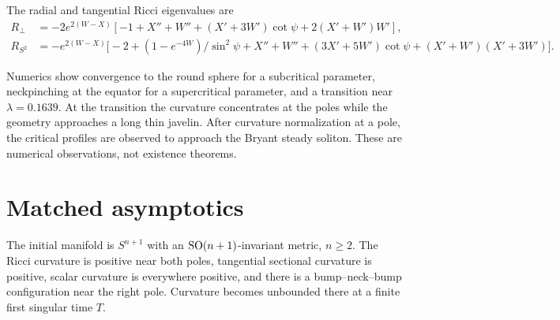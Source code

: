 \begin{definition}
\label{def:chow-iv-rotational-ricci-eigenvalues}
The radial and tangential Ricci eigenvalues are
\begin{align*}
 R_\perp&=-2e^{2(W-X)}[-1+X''+W''+(X'+3W')\cot\psi+2(X'+W')W'],\\
 R_{S^2}&=-e^{2(W-X)}\bigl[-2+(1-e^{-4W})/\sin^2\psi+X''+W''
 +(3X'+5W')\cot\psi +(X'+W')(X'+3W')\bigr].
\end{align*}
\end{definition}

\begin{remark}
\label{rem:chow-iv-numerical-phase-transition}
Numerics show convergence to the round sphere for a subcritical parameter,
neckpinching at the equator for a supercritical parameter, and a transition
near $\lambda=0.1639$.  At the transition the curvature concentrates at the
poles while the geometry approaches a long thin javelin.  After curvature
normalization at a pole, the critical profiles are observed to approach the
Bryant steady soliton.  These are numerical observations, not existence
theorems.
\end{remark}

\section{Matched asymptotics}

\begin{definition}
\label{def:chow-iv-primary-degenerate-neckpinch-ansatz}
The initial manifold is $S^{n+1}$ with an $\operatorname{SO}(n+1)$-invariant metric,
$n\ge2$.  The Ricci curvature is positive near both poles, tangential
sectional curvature is positive, scalar curvature is everywhere positive, and
there is a bump--neck--bump configuration near the right pole.  Curvature
becomes unbounded there at a finite first singular time $T$.
\end{definition}

